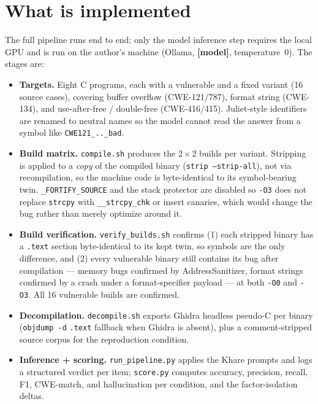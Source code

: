 \documentclass[10pt]{article}
\newcommand{\placeholder}[1]{{\color{red}\textbf{[#1]}}}
\begin{document}
\section{What is implemented}
The full pipeline runs end to end; only the model inference step requires the
local GPU and is run on the author's machine (Ollama, \placeholder{model},
temperature~0). The stages are:
\begin{itemize}
\item \textbf{Targets.} Eight C programs, each with a vulnerable and a fixed
variant (16 source cases), covering buffer overflow (CWE-121/787), format string
(CWE-134), and use-after-free / double-free (CWE-416/415). Juliet-style
identifiers are renamed to neutral names so the model cannot read the answer from
a symbol like \texttt{CWE121\_..\_bad}.
\item \textbf{Build matrix.} \texttt{compile.sh} produces the $2\times2$ builds per
variant. Stripping is applied to a \emph{copy} of the compiled binary
(\texttt{strip --strip-all}), not via recompilation, so the machine code is
byte-identical to its symbol-bearing twin. \texttt{\_FORTIFY\_SOURCE} and the
stack protector are disabled so \texttt{-O3} does not replace \texttt{strcpy}
with \texttt{\_\_strcpy\_chk} or insert canaries, which would change the bug
rather than merely optimize around it.
\item \textbf{Build verification.} \texttt{verify\_builds.sh} confirms (1) each
stripped binary has a \texttt{.text} section byte-identical to its kept twin, so
symbols are the only difference, and (2) every vulnerable binary still contains
its bug after compilation --- memory bugs confirmed by AddressSanitizer, format
strings confirmed by a crash under a format-specifier payload --- at both
\texttt{-O0} and \texttt{-O3}. All 16 vulnerable builds are confirmed.
\item \textbf{Decompilation.} \texttt{decompile.sh} exports Ghidra headless
pseudo-C per binary (\texttt{objdump -d} \texttt{.text} fallback when Ghidra is
absent), plus a comment-stripped source corpus for the reproduction condition.
\item \textbf{Inference + scoring.} \texttt{run\_pipeline.py} applies the Khare
prompts and logs a structured verdict per item; \texttt{score.py} computes
accuracy, precision, recall, F1, CWE-match, and hallucination per condition, and
the factor-isolation deltas.
\end{itemize}
\end{document}
